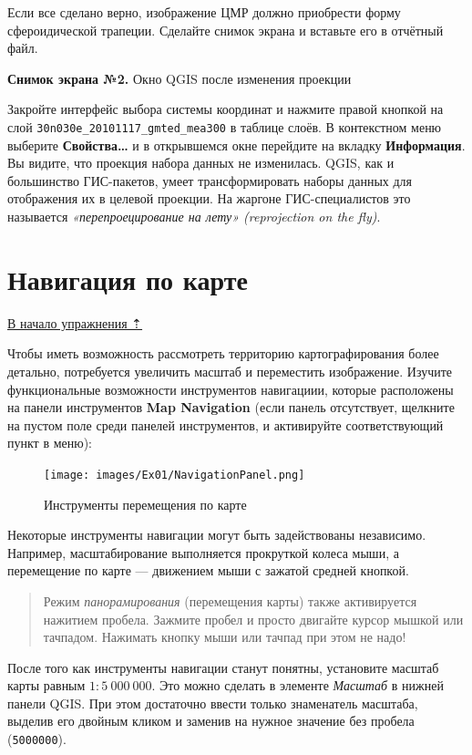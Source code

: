 \documentclass[
  12pt,
]{book}
\begin{document}
Если все сделано верно, изображение ЦМР должно приобрести форму сфероидической трапеции. Сделайте снимок экрана и вставьте его в отчётный файл.

\textbf{Снимок экрана №2.} Окно QGIS после изменения проекции

Закройте интерфейс выбора системы координат и нажмите правой кнопкой на слой \texttt{30n030e\_20101117\_gmted\_mea300} в таблице слоёв. В контекстном меню выберите \textbf{Свойства\ldots{}} и в открывшемся окне перейдите на вкладку \textbf{Информация}. Вы видите, что проекция набора данных не изменилась. QGIS, как и большинство ГИС-пакетов, умеет трансформировать наборы данных для отображения их в целевой проекции. На жаргоне ГИС-специалистов это называется \emph{«перепроецирование на лету» (reprojection on the fly)}.

\hypertarget{map-design-general-navigation}{%
\section{Навигация по карте}\label{map-design-general-navigation}}

\protect\hyperlink{map-design-general}{В начало упражнения ⇡}

Чтобы иметь возможность рассмотреть территорию картографирования более детально, потребуется увеличить масштаб и переместить изображение. Изучите функциональные возможности инструментов навигациии, которые расположены на панели инструментов \textbf{Map Navigation} (если панель отсутствует, щелкните на пустом поле среди панелей инструментов, и активируйте соответствующий пункт в меню):

\begin{figure}
\centering
\texttt{[image: images/Ex01/NavigationPanel.png]}
\caption{Инструменты перемещения по карте}
\end{figure}

Некоторые инструменты навигации могут быть задействованы независимо. Например, масштабирование выполняется прокруткой колеса мыши, а перемещение по карте --- движением мыши с зажатой средней кнопкой.

\begin{quote}
Режим \emph{панорамирования} (перемещения карты) также активируется нажитием пробела. Зажмите пробел и просто двигайте курсор мышкой или тачпадом. Нажимать кнопку мыши или тачпад при этом не надо!
\end{quote}

После того как инструменты навигации станут понятны, установите масштаб карты равным \(1:5~000~000\). Это можно сделать в элементе \emph{Масштаб} в нижней панели QGIS. При этом достаточно ввести только знаменатель масштаба, выделив его двойным кликом и заменив на нужное значение без пробела (\texttt{5000000}).
\end{document}
